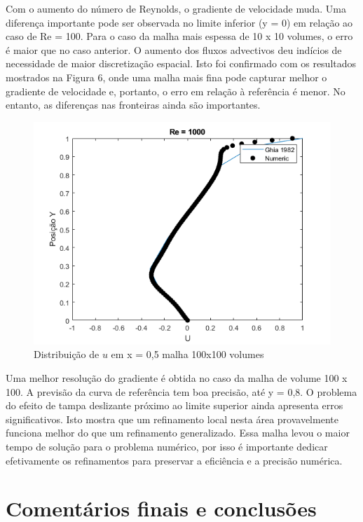 \documentclass[]{article}
\begin{document}
Com o aumento do número de Reynolds, o gradiente de velocidade muda. Uma diferença importante pode ser observada no limite inferior (y = 0) em relação ao caso de Re = 100. Para o caso da malha mais espessa de 10 x 10 volumes, o erro é maior que no caso anterior. O aumento dos fluxos advectivos deu indícios de necessidade de maior discretização espacial. Isto foi confirmado com os resultados mostrados na Figura 6, onde uma malha mais fina pode capturar melhor o gradiente de velocidade e, portanto, o erro em relação à referência é menor. No entanto, as diferenças nas fronteiras ainda são importantes.

\begin{figure}[H]
	\centering
	\includegraphics[width=.65\textwidth]{figures/8}
	\caption{Distribuição de $u$ em x = 0,5 malha 100x100 volumes}
\end{figure}

Uma melhor resolução do gradiente é obtida no caso da malha de volume 100 x 100. A previsão da curva de referência tem boa precisão, até y = 0,8. O problema do efeito de tampa deslizante próximo ao limite superior ainda apresenta erros significativos. Isto mostra que um refinamento local nesta área provavelmente funciona melhor do que um refinamento generalizado. Essa malha levou o maior tempo de solução para o problema numérico, por isso é importante dedicar efetivamente os refinamentos para preservar a eficiência e a precisão numérica.

\section*{Comentários finais e conclusões}
\end{document}
